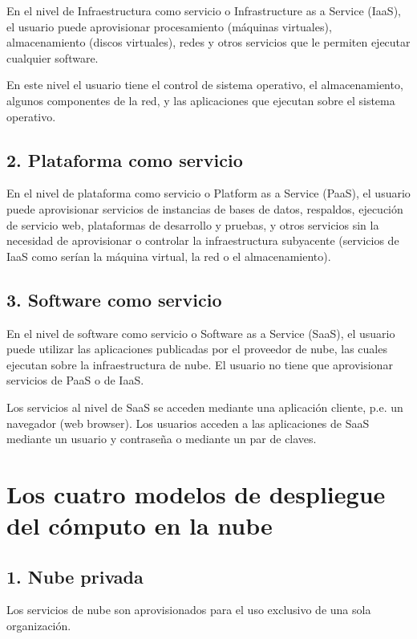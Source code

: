 \documentclass[11pt,a4paper,oneside]{book}
\begin{document}
En el nivel de Infraestructura como servicio o Infrastructure as a Service (IaaS), el usuario puede aprovisionar procesamiento (máquinas virtuales), almacenamiento (discos virtuales), redes y otros servicios que le permiten ejecutar cualquier software.

En este nivel el usuario tiene el control de sistema operativo, el almacenamiento, algunos componentes de la red, y las aplicaciones que ejecutan sobre el sistema operativo.

\subsection{2. Plataforma como servicio}

En el nivel de plataforma como servicio o Platform as a Service (PaaS), el usuario puede aprovisionar servicios de instancias de bases de datos, respaldos, ejecución de servicio web, plataformas de desarrollo y pruebas, y otros servicios sin la necesidad de aprovisionar o controlar la infraestructura subyacente (servicios de IaaS como serían la máquina virtual, la red o el almacenamiento).

\subsection{3. Software como servicio}

En el nivel de software como servicio o Software as a Service (SaaS), el usuario puede utilizar las aplicaciones publicadas por el proveedor de nube, las cuales ejecutan sobre la infraestructura de nube. El usuario no tiene que aprovisionar servicios de PaaS o de IaaS.

Los servicios al nivel de SaaS se acceden mediante una aplicación cliente, p.e. un navegador (web browser). Los usuarios acceden a las aplicaciones de SaaS mediante un usuario y contraseña o mediante un par de claves.

\section{Los cuatro modelos de despliegue del cómputo en la nube}

\subsection{1. Nube privada}

Los servicios de nube son aprovisionados para el uso exclusivo de una sola organización.
\end{document}
